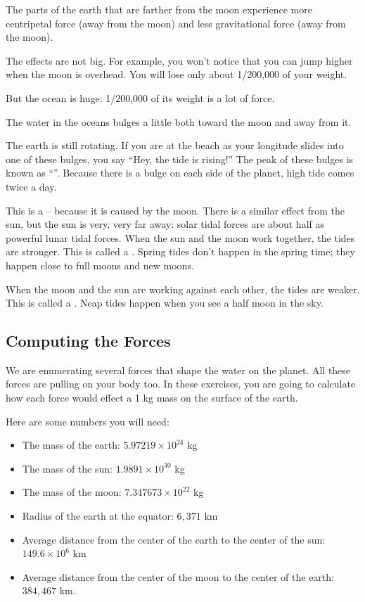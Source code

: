 The parts of the earth that are farther from the moon experience more centripetal force (away from the moon) and less gravitational force (away from the moon).   

The effects are not big. For example, you won't notice that you can jump higher when the moon is 
overhead. You will lose only about 1/200,000 of your weight.

But the ocean is huge: 1/200,000 of its weight is a lot of force.

The water in the oceans bulges a little both toward the moon and away from it.

The earth is still rotating.  If you are at the beach as your longitude slides into one of these bulges,   you say ``Hey, the tide is rising!''  The peak of these bulges is known as ``''. Because there is a bulge on each side of the planet, high tide comes twice a day.

This is a  -- because it is caused by the moon. There is a similar effect from the sun, but the sun is very, very far away: solar tidal forces are about half as powerful lunar tidal forces. When the sun and the moon work together,   the tides are stronger.  This is called a . Spring tides don't happen in the spring time;  they happen close to full moons and new moons.

When the moon and the sun are working against each other, the tides are weaker. This is called a . Neap tides happen when you see a half moon in the sky.

\subsection{Computing the Forces}

We are enumerating several forces that shape the water on the planet.  All these forces are pulling on your
body too.  In these exercises, you are going to calculate how each force would effect a 1 kg mass on the surface of the earth.

Here are some numbers you will need:
\begin{itemize}
\item The mass of the earth: $5.97219 \times 10^{24}$ kg
\item The mass of the sun:  $1.9891 \times 10^{30}$ kg
\item The mass of the moon: $7.347673 \times 10^{22}$ kg
\item Radius of the earth at the equator: $6,371$ km
\item Average distance from the center of the earth to the center of the sun:  $149.6 \times 10^6$ km
\item Average distance from the center of the moon to the center of the earth: $384,467$ km.
\end{itemize}


